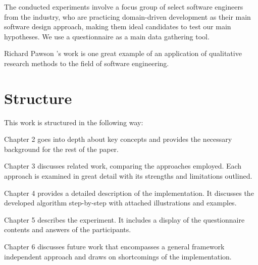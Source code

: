 The conducted experiments involve a focus group of select software engineers from the industry, who are practicing domain-driven development as their main software design approach, making them ideal candidates to test our main hypotheses.
We use a questionnaire as a main data gathering tool.

\n

Richard Pawson \cite{pawson}'s work is one great example of an application of qualitative research methods to the field of software engineering.

\section{Structure}

This work is structured in the following way: 

\n

\noindent Chapter 2 goes into depth about key concepts and provides the necessary background for the rest of the paper.

\n

\noindent Chapter 3 discusses related work, comparing the approaches employed. Each approach is examined in great detail with its strengths and limitations outlined.

\n

\noindent Chapter 4 provides a detailed description of the implementation. It discusses the developed algorithm step-by-step with attached illustrations and examples.

\n

\noindent Chapter 5 describes the experiment. It includes a display of the questionnaire contents and answers of the participants.

\n

\noindent Chapter 6 discusses future work that encompasses a general framework independent approach and draws on shortcomings of the implementation.
